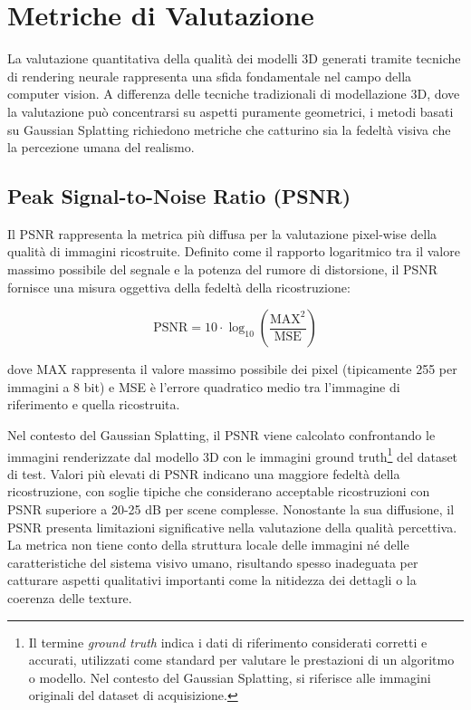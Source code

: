 \newpage

\section{Metriche di Valutazione}
La valutazione quantitativa della qualità dei modelli 3D generati tramite tecniche di rendering neurale rappresenta una sfida fondamentale nel campo della computer vision. A differenza delle tecniche tradizionali di modellazione 3D, dove la valutazione può concentrarsi su aspetti puramente geometrici, i metodi basati su Gaussian Splatting richiedono metriche che catturino sia la fedeltà visiva che la percezione umana del realismo.

\subsection{Peak Signal-to-Noise Ratio (PSNR)}
Il PSNR rappresenta la metrica più diffusa per la valutazione pixel-wise della qualità di immagini ricostruite. Definito come il rapporto logaritmico tra il valore massimo possibile del segnale e la potenza del rumore di distorsione, il PSNR fornisce una misura oggettiva della fedeltà della ricostruzione:

\begin{equation}
	\text{PSNR} = 10 \cdot \log_{10}\left(\frac{\text{MAX}^2}{\text{MSE}}\right)
\end{equation}

dove MAX rappresenta il valore massimo possibile dei pixel (tipicamente 255 per immagini a 8 bit) e MSE è l'errore quadratico medio tra l'immagine di riferimento e quella ricostruita.

Nel contesto del Gaussian Splatting, il PSNR viene calcolato confrontando le immagini renderizzate dal modello 3D con le immagini ground truth\footnote{Il termine \emph{ground truth} indica i dati di riferimento considerati corretti e accurati, utilizzati come standard per valutare le prestazioni di un algoritmo o modello. Nel contesto del Gaussian Splatting, si riferisce alle immagini originali del dataset di acquisizione.} del dataset di test. Valori più elevati di PSNR indicano una maggiore fedeltà della ricostruzione, con soglie tipiche che considerano acceptable ricostruzioni con PSNR superiore a 20-25 dB per scene complesse.\newline
Nonostante la sua diffusione, il PSNR presenta limitazioni significative nella valutazione della qualità percettiva. La metrica non tiene conto della struttura locale delle immagini né delle caratteristiche del sistema visivo umano, risultando spesso inadeguata per catturare aspetti qualitativi importanti come la nitidezza dei dettagli o la coerenza delle texture.

